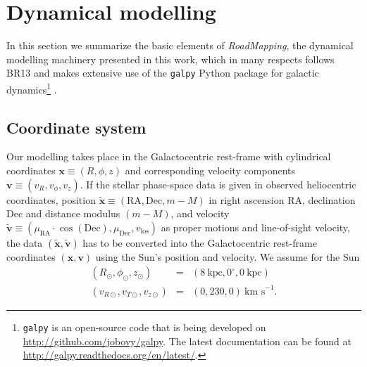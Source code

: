 \documentclass[iop,revtex4]{emulateapj}
\newcommand{\vect}[1]{\boldsymbol{#1}}
\newcommand{\RM}{{\sl RoadMapping}}
\begin{document}


\section{Dynamical modelling}

In this section we summarize the basic elements of \RM{}, the dynamical modelling machinery presented in this work, which in many respects follows BR13 and makes extensive use of the \texttt{galpy} Python package for galactic dynamics\footnote{\texttt{galpy} is an open-source code that is being developed on \url{http://github.com/jobovy/galpy}. The latest documentation can be found at \url{http://galpy.readthedocs.org/en/latest/}.} \citep{2015ApJS..216...29B}.


\subsection{Coordinate system} \label{sec:coordinates}

Our modelling takes place in the Galactocentric rest-frame with cylindrical coordinates $\vect{x} \equiv (R,\phi,z)$ and corresponding velocity components $\vect{v} \equiv (v_R,v_\phi,v_z)$. If the stellar phase-space data is given in observed heliocentric coordinates, position $\tilde{\vect{x}} \equiv(\text{RA},\text{Dec},m-M)$ in right ascension RA, declination Dec and distance modulus $(m-M)$, and velocity $\tilde{\vect{v}} \equiv (\mu_\text{RA} \cdot \cos ( \text{Dec}),\mu_\text{Dec},v_\text{los})$ as proper motions and line-of-sight velocity, the data $(\tilde{\vect{x}},\tilde{\vect{v}})$ has to be converted into the Galactocentric rest-frame coordinates $(\vect{x},\vect{v})$ using the Sun's position and velocity. We assume for the Sun
\begin{eqnarray*}
(R_\odot,\phi_\odot,z_\odot) &=&(8~\text{kpc}, 0^\circ, 0~\text{kpc})\\
(v_{R\odot},v_{T\odot},v_{z\odot}) &=& (0,230,0)~\text{km s}^{-1}.
\end{eqnarray*}
\end{document}
